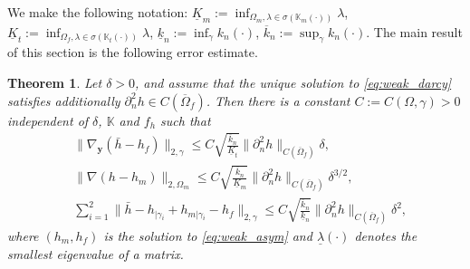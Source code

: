 \documentclass[a4paper]{article}
\newtheorem{theorem}{Theorem}
\def\vc#1{\mathbf{\boldsymbol{#1}}}     %
\def\tn#1{{\mathbb{#1}}}    %
\def\norm#1{\|#1\|}
\def\yy{{\vc y}}
\begin{document}
We make the following notation:
$\underline K_m := \inf_{\Omega_m,\lambda\in\sigma(\tn K_m(\cdot))}\lambda$, $\underline K_t := \inf_{\Omega_f,\lambda\in\sigma(\tn K_t(\cdot))}\lambda$, $\underline k_n:=\inf_{\gamma}k_n(\cdot)$, $\overline k_n:=\sup_{\gamma}k_n(\cdot)$.
The main result of this section is the following error estimate.
\begin{theorem}
\label{th:error_estimate}
Let $\delta>0$, and assume that the unique solution to \eqref{eq:weak_darcy} satisfies additionally $\partial_n^2 h\in C(\overline\Omega_f)$.
Then there is a constant $C:=C(\Omega,\gamma)>0$ independent of $\delta$, $\tn K$ and $f_h$ such that
\begin{subequations}
\label{eq:error_estimates_delta}
\begin{align}
&\norm{\nabla_\yy(\bar h- h_f)}_{2,\gamma} \le C\sqrt{\frac{\overline k_n}{\underline K_t}}\norm{\partial_n^2 h}_{C(\overline\Omega_f)}\delta,\\
&\norm{\nabla(h-h_m)}_{2,\Omega_m} \le C\sqrt{\frac{\overline k_n}{\underline K_m}}\norm{\partial_n^2 h}_{C(\overline\Omega_f)}\delta^{3/2},\\
&\sum_{i=1}^2\norm{\bar h-h_{|\gamma_i}+h_{m|\gamma_i}-h_f}_{2,\gamma} \le C\sqrt{\frac{\overline k_n}{\underline k_n}}\norm{\partial_n^2 h}_{C(\overline\Omega_f)}\delta^2,
\end{align}
\end{subequations}
where $(h_m,h_f)$ is the solution to \eqref{eq:weak_asym} and $\underline\lambda(\cdot)$ denotes the smallest eigenvalue of a matrix.
\end{theorem}
\end{document}
